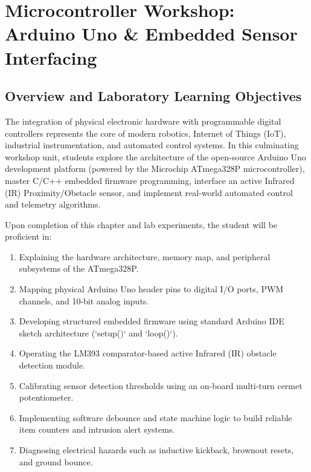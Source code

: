 \chapter{Microcontroller Workshop: Arduino Uno \& Embedded Sensor Interfacing}
\label{chap:arduino}

\section{Overview and Laboratory Learning Objectives}
The integration of physical electronic hardware with programmable digital controllers represents the core of modern robotics, Internet of Things (IoT), industrial instrumentation, and automated control systems. In this culminating workshop unit, students explore the architecture of the open-source Arduino Uno development platform (powered by the Microchip ATmega328P microcontroller), master C/C++ embedded firmware programming, interface an active Infrared (IR) Proximity/Obstacle sensor, and implement real-world automated control and telemetry algorithms.

\begin{important}
Upon completion of this chapter and lab experiments, the student will be proficient in:
\begin{enumerate}[leftmargin=1.5em]
    \item Explaining the hardware architecture, memory map, and peripheral subsystems of the ATmega328P.
    \item Mapping physical Arduino Uno header pins to digital I/O ports, PWM channels, and 10-bit analog inputs.
    \item Developing structured embedded firmware using standard Arduino IDE sketch architecture (`setup()` and `loop()`).
    \item Operating the LM393 comparator-based active Infrared (IR) obstacle detection module.
    \item Calibrating sensor detection thresholds using an on-board multi-turn cermet potentiometer.
    \item Implementing software debounce and state machine logic to build reliable item counters and intrusion alert systems.
    \item Diagnosing electrical hazards such as inductive kickback, brownout resets, and ground bounce.
\end{enumerate}
\end{important}

